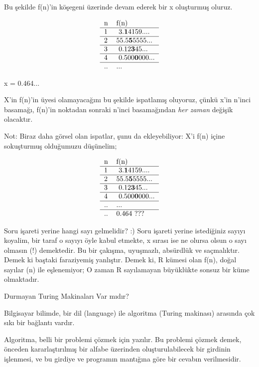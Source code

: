 \documentclass[12pt,fleqn]{article}\usepackage{../../common}
\begin{document}
Bu şekilde f(n)'in köşegeni üzerinde devam ederek bir x oluşturmuş oluruz.

$$
\begin{tabular}{ll}
n & f(n) \\
\hline
1 &  \textrm{ }3.\textbf{1}4159....\\
\hline
2 &  55.5\textbf{5}5555...\\
\hline
3 &  \textrm{ }0.12\textbf{3}45...\\
\hline
4 &  \textrm{ }0.500\textbf{0}000...\\
\hline
.. &  ...
\end{tabular}
$$

x = 0.464...

X'in f(n)'in üyesi olamayacağını bu şekilde ispatlamış oluyoruz, çünkü x'in
n'inci basamağı, f(n)'in noktadan sonraki n'inci basamağından {\em her zaman}
değişik olacaktır.

Not: Biraz daha görsel olan ispatlar, şunu da ekleyebiliyor: X'i f(n) içine
sokuşturmuş olduğumuzu düşünelim;

$$
\begin{tabular}{ll}
n & f(n) \\
\hline
1 &  \textrm{ }3.\textbf{1}4159....\\
\hline
2 &  55.5\textbf{5}5555...\\
\hline
3 &  \textrm{ }0.12\textbf{3}45...\\
\hline
4 &  \textrm{ }0.500\textbf{0}000...\\
\hline
.. &  ... \\
\hline
.. &  0.464 ???
\end{tabular}
$$

Soru işareti yerine hangi sayı gelmelidir? :) Soru işareti yerine
istediğiniz sayıyı koyalim, bir taraf o sayıyı öyle kabul etmekte, x sırası
ise ne olursa olsun o sayı olmasın (!)  demektedir. Bu bir çakışma,
uyuşmazlı, absürdlük ve saçmalıktır. Demek ki baştaki faraziyemiş
yanlıştır. Demek ki, R kümesi olan f(n), doğal sayılar (n) ile eşlenemiyor;
O zaman R sayılamayan büyüklükte sonsuz bir küme olmaktadır.

Durmayan Turing Makinaları Var mıdır?

Bilgisayar bilimde, bir dil (language) ile algoritma (Turing makinası) arasında
çok sıkı bir bağlantı vardır.

Algoritma, belli bir problemi çözmek için yazılır. Bu problemi çözmek
demek, önceden kararlaştırılmış bir alfabe üzerinden oluşturulabilecek bir
girdinin işlenmesi, ve bu girdiye ve programın mantığına göre bir cevabın
verilmesidir.
\end{document}
